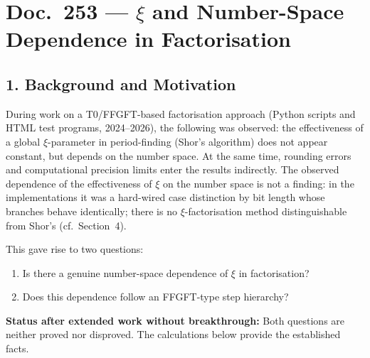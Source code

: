 \section*{Doc.\ 253 — \texorpdfstring{$\xi$}{xi} and Number-Space Dependence in Factorisation}

\begin{abstract}
Working document. Purpose: preservation of results from an extended investigation
without breakthrough. The question investigated was whether the FFGFT parameter
$\xi = 4/30000$ exhibits number-space dependence in the factorisation of composite
integers, and whether this dependence follows an FFGFT-type step hierarchy.
All calculations were verified with Python. The connection to FFGFT remains
a conjecture without an algebraic bridge proof.
\end{abstract}

\subsection*{1. Background and Motivation}

During work on a T0/FFGFT-based factorisation approach (Python scripts and
HTML test programs, 2024--2026), the following was observed: the effectiveness
of a global $\xi$-parameter in period-finding (Shor's algorithm) does not
appear constant, but depends on the number space. At the same time, rounding
errors and computational precision limits enter the results indirectly.
The observed dependence of the effectiveness of $\xi$ on the number space is
not a finding: in the implementations it was a hard-wired case distinction by
bit length whose branches behave identically; there is no $\xi$-factorisation
method distinguishable from Shor's (cf.\ Section~4).

This gave rise to two questions:

\begin{enumerate}
\item Is there a genuine number-space dependence of $\xi$ in factorisation?
\item Does this dependence follow an FFGFT-type step hierarchy?
\end{enumerate}

\begin{mdframed}[style=warn]
\textbf{Status after extended work without breakthrough:} Both questions are
neither proved nor disproved. The calculations below provide the established facts.
\end{mdframed}


